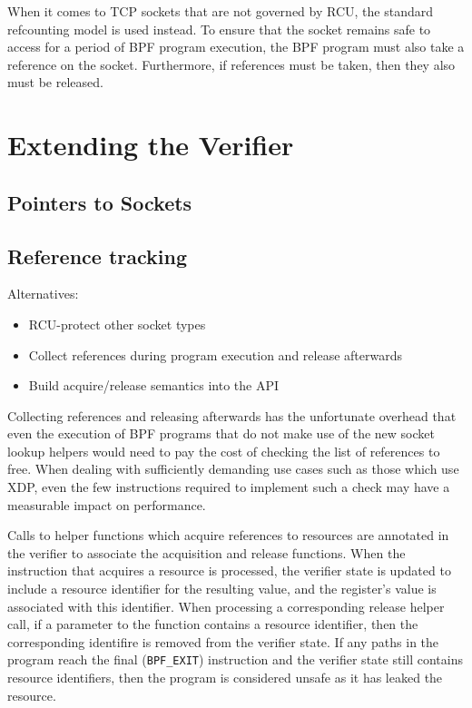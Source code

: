 \documentclass[10pt,sigconf,authorversion]{lpc}
\begin{document}
When it comes to TCP sockets that are not governed by RCU, the standard
refcounting model is used instead. To ensure that the socket remains safe to
access for a period of BPF program execution, the BPF program must also take a
reference on the socket. Furthermore, if references must be taken, then they
also must be released.

\section{Extending the Verifier}

\subsection{Pointers to Sockets}

\subsection{Reference tracking}

Alternatives:
\begin{itemize}
\item RCU-protect other socket types
\item Collect references during program execution and release afterwards
\item Build acquire/release semantics into the API
\end{itemize}

Collecting references and releasing afterwards has the unfortunate overhead
that even the execution of BPF programs that do not make use of the new socket
lookup helpers would need to pay the cost of checking the list of references
to free. When dealing with sufficiently demanding use cases such as those which
use XDP, even the few instructions required to implement such a check may have
a measurable impact on performance.

Calls to helper functions which acquire references to resources are annotated
in the verifier to associate the acquisition and release functions. When the
instruction that acquires a resource is processed, the verifier state is
updated to include a resource identifier for the resulting value, and the
register's value is associated with this identifier. When processing a
corresponding release helper call, if a parameter to the function contains a
resource identifier, then the corresponding identifire is removed from the
verifier state. If any paths in the program reach the final (\verb+BPF_EXIT+)
instruction and the verifier state still contains resource identifiers, then
the program is considered unsafe as it has leaked the resource.
\end{document}
